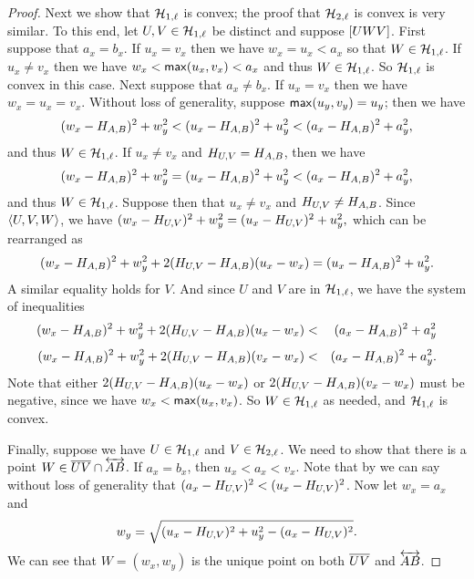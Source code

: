 \begin{proof}
Next we show that \(\mathcal{H}_{1,\ell}\) is convex; the proof that \(\mathcal{H}_{2,\ell}\) is convex is very similar.
To this end, let \(U,V \in \mathcal{H}_{1,\ell}\) be distinct and suppose \([ U W V ]\).
First suppose that \(a_x = b_x\).
If \(u_x = v_x\) then we have \(w_x = u_x < a_x\) so that \(W \in \mathcal{H}_{1,\ell}\).
If \(u_x \neq v_x\) then we have \(w_x < \mathsf{max}(u_x,v_x) < a_x\) and thus \(W \in \mathcal{H}_{1,\ell}\).
So \(\mathcal{H}_{1,\ell}\) is convex in this case.
Next suppose that \(a_x \neq b_x\).
If \(u_x = v_x\) then we have \(w_x = u_x = v_x\).
Without loss of generality, suppose \(\mathsf{max}(u_y,v_y) = u_y\); then we have \[ (w_x - H_{A,B})^2 + w_y^2 < (u_x - H_{A,B})^2 + u_y^2 < (a_x - H_{A,B})^2 + a_y^2, \] and thus \(W \in \mathcal{H}_{1,\ell}\).
If \(u_x \neq v_x\) and \(H_{U,V} = H_{A,B}\), then we have \[ (w_x - H_{A,B})^2 + w_y^2 = (u_x - H_{A,B})^2 + u_y^2 < (a_x - H_{A,B})^2 + a_y^2, \] and thus \(W \in \mathcal{H}_{1,\ell}\).
Suppose then that \(u_x \neq v_x\) and \(H_{U,V} \neq H_{A,B}\).
Since \(\langle U, V, W \rangle\), we have \((w_x - H_{U,V})^2 + w_y^2 = (u_x - H_{U,V})^2 + u_y^2,\) which can be rearranged as \[ (w_x - H_{A,B})^2 + w_y^2 + 2(H_{U,V} - H_{A,B})(u_x - w_x) = (u_x - H_{A,B})^2 + u_y^2. \]
A similar equality holds for \(V\).
And since \(U\) and \(V\) are in \(\mathcal{H}_{1,\ell}\), we have the system of inequalities
\begin{eqnarray*}
(w_x - H_{A,B})^2 + w_y^2 + 2(H_{U,V} - H_{A,B})(u_x - w_x) & < & (a_x - H_{A,B})^2 + a_y^2 \\[4pt]
(w_x - H_{A,B})^2 + w_y^2 + 2(H_{U,V} - H_{A,B})(v_x - w_x) & < & (a_x - H_{A,B})^2 + a_y^2.
\end{eqnarray*}
Note that either \(2(H_{U,V} - H_{A,B})(u_x - w_x)\) or \(2(H_{U,V} - H_{A,B})(v_x - w_x)\) must be negative, since we have \(w_x < \mathsf{max}(u_x,v_x)\).
So \(W \in \mathcal{H}_{1,\ell}\) as needed, and \(\mathcal{H}_{1,\ell}\) is convex.

Finally, suppose we have \(U \in \mathcal{H}_{1,\ell}\) and \(V \in \mathcal{H}_{2,\ell}\).
We need to show that there is a point \(W \in \overline{UV} \cap \overleftrightarrow{AB}\).
If \(a_x = b_x\), then \(u_x < a_x < v_x\).
Note that by  we can say without loss of generality that \((a_x - H_{U,V})^2 < (u_x - H_{U,V})^2\).
Now let \(w_x = a_x\) and \[ w_y = \sqrt{(u_x - H_{U,V})^2 + u_y^2 - (a_x - H_{U,V})^2}. \]
We can see that \(W = (w_x,w_y)\) is the unique point on both \(\overline{UV}\) and \(\overleftrightarrow{AB}\).


\end{proof}
